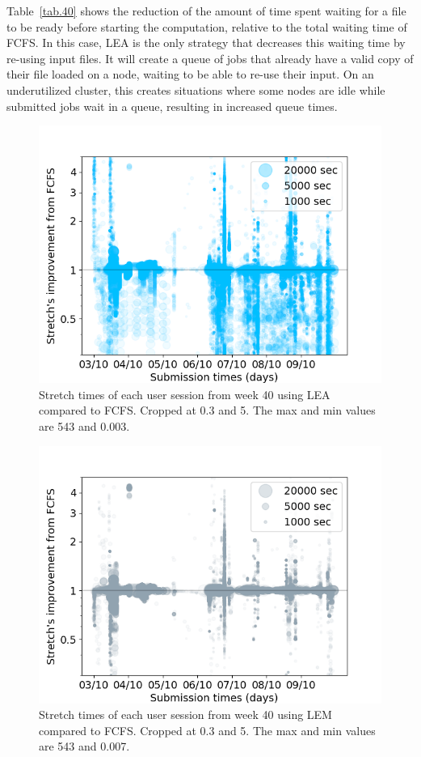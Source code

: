 \documentclass[conference]{IEEEtran}
\begin{document}
Table~\ref{tab.40} shows the reduction of the amount of time spent 
waiting for a file to be ready before starting the computation,
relative to the total waiting time of FCFS.
In this case, LEA is the only strategy that decreases this waiting time by re-using input files.
It will create a queue of jobs that already have a valid copy of their file loaded on a node, waiting to be able to re-use their input.
On an underutilized cluster, this creates situations where some nodes are idle while submitted jobs wait in a queue,
resulting in increased queue times.
\begin{figure}[t]\centering\includegraphics[width=0.9\linewidth]{../MBSS/plot/Stretch_times/Stretch_times_FCFS_LEA_2022-10-03->2022-10-09_V10000_anonymous_450_128_32_256_4_1024.png}\caption{Stretch times of each user session from week 40 using LEA compared to FCFS. Cropped at 0.3 and 5. The max and min values are 543 and 0.003.}\label{40_fcfs_vs_lea}\end{figure}
\begin{figure}[t]\centering\includegraphics[width=0.9\linewidth]{../MBSS/plot/Stretch_times/Stretch_times_FCFS_LEM_2022-10-03->2022-10-09_V10000_anonymous_450_128_32_256_4_1024.png}\caption{Stretch times of each user session from week 40 using LEM compared to FCFS. Cropped at 0.3 and 5. The max and min values are 543 and 0.007.}\label{40_fcfs_vs_lem}\end{figure}
\end{document}
